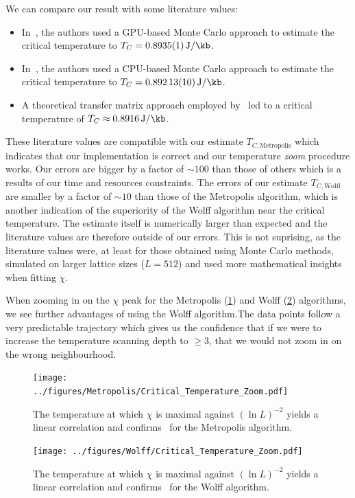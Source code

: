 		We can compare our result with some literature values:
		\begin{itemize}
			\item In~\citet{literature_gpu}, the authors used a GPU-based Monte Carlo approach to estimate the critical temperature to $T_C=\SI{0.8935(1)}{\J\per\kb}$.
			\item In~\citet{literature_cpu}, the authors used a CPU-based Monte Carlo approach to estimate the critical temperature to $T_C=\SI{0.89213(10)}{\J\per\kb}$.
			\item A theoretical transfer matrix approach employed by~\cite{literature_theo} led to a critical temperature of $T_C \approx \SI{0.8916}{\J\per\kb}$.
		\end{itemize}
		These literature values are compatible with our estimate $T_{C, \text{Metropolis}}$ which indicates that our implementation is correct and our temperature \emph{zoom} procedure works. Our errors are bigger by a factor of $\sim 100$ than those of others which is a results of our time and resources constraints. The errors of our estimate $T_{C, \text{Wolff}}$ are smaller by a factor of $\sim 10$ than those of the Metropolis algorithm, which is another indication of the superiority of the Wolff algorithm near the critical temperature. The estimate itself is numerically larger than expected and the literature values are therefore outside of our errors. This is not suprising, as the literature values were, at least for those obtained using Monte Carlo methods, simulated on larger lattice sizes ($L = 512$) and used more mathematical insights when fitting $\chi$.

		When zooming in on the $\chi$ peak for the Metropolis (\cref{fig:critical_temperature_zoom}) and Wolff (\cref{fig:critical_temperature_wolf_zoom}) algorithms, we see further advantages of  using the Wolff algorithm.The data points follow a very predictable trajectory which gives us the confidence that if we were to increase the temperature scanning depth to $\geq 3$, that we would not zoom in on the wrong neighbourhood.
		\begin{figure}[htbp]
			\centering
			\texttt{[image: ../figures/Metropolis/Critical\_Temperature\_Zoom.pdf]}
			\caption[Estimating $T_C$ using the Metropolis algorithm by plotting $T$ where $\chi$ is maximal against $(\ln L)^{-2}$]{The temperature at which $\chi$ is maximal against $(\ln L)^{-2}$ yields a linear correlation and confirms~ for the Metropolis algorithm.}
			\label{fig:critical_temperature_zoom}
		\end{figure}
		\begin{figure}[htbp]
			\centering
			\texttt{[image: ../figures/Wolff/Critical\_Temperature\_Zoom.pdf]}
			\caption[Estimating $T_C$ using the Wolff algorithm by plotting $T$ where $\chi$ is maximal against $(\ln L)^{-2}$]{The temperature at which $\chi$ is maximal against $(\ln L)^{-2}$ yields a linear correlation and confirms~ for the Wolff algorithm.}
			\label{fig:critical_temperature_wolf_zoom}
		\end{figure}
